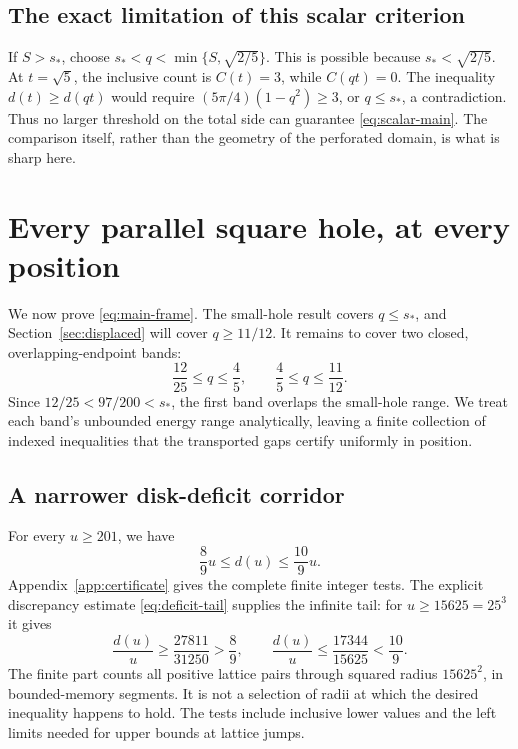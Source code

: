 \documentclass[11pt,reqno]{amsart}
\numberwithin{equation}{section}
\newcommand{\sstar}{s_*}
\begin{document}
\subsection*{The exact limitation of this scalar criterion}

If $S>\sstar$, choose
$\sstar<q<\min\{S,\sqrt{2/5}\}$. This is possible because
$\sstar<\sqrt{2/5}$. At $t=\sqrt5$, the inclusive count is
$C(t)=3$, while $C(qt)=0$. The inequality
$d(t)\ge d(qt)$ would require
$(5\pi/4)(1-q^2)\ge3$, or $q\le\sstar$, a contradiction.
Thus no larger threshold on the total side can guarantee
\eqref{eq:scalar-main}. The comparison itself, rather than the
geometry of the perforated domain, is what is sharp here.

\section{Every parallel square hole, at every position}\label{sec:all-squares}

We now prove \eqref{eq:main-frame}. The small-hole result covers
$q\le s_*$, and Section~\ref{sec:displaced} will cover
$q\ge11/12$. It remains to cover two closed, overlapping-endpoint
bands:
\[
 \frac{12}{25}\le q\le\frac45,
 \qquad
 \frac45\le q\le\frac{11}{12}.
\]
Since $12/25<97/200<s_*$, the first band overlaps the
small-hole range. We treat each band's unbounded energy range
analytically, leaving a finite collection of indexed inequalities
that the transported gaps certify uniformly in position.

\subsection*{A narrower disk-deficit corridor}

For every $u\ge201$, we have
\begin{equation}\label{eq:corridor}
 \frac89u\le d(u)\le\frac{10}{9}u.
\end{equation}
Appendix~\ref{app:certificate} gives the complete finite
integer tests. The explicit discrepancy estimate
\eqref{eq:deficit-tail} supplies the infinite tail: for
$u\ge15625=25^3$ it gives
\[
 \frac{d(u)}u\ge\frac{27811}{31250}>\frac89,
 \qquad
 \frac{d(u)}u\le\frac{17344}{15625}<\frac{10}{9}.
\]
The finite part counts all positive lattice pairs through
squared radius $15625^2$, in bounded-memory segments. It is
not a selection of radii at which the desired inequality happens
to hold. The tests include inclusive lower values and the left
limits needed for upper bounds at lattice jumps.
\end{document}
